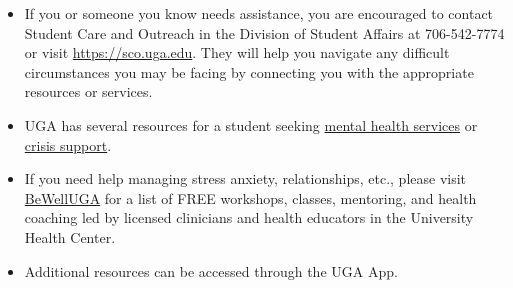 \documentclass[11pt, letterpaper]{article}
\begin{document}
\begin{itemize}
	\item If you or someone you know needs assistance, you are encouraged to contact Student Care and Outreach in the Division of Student Affairs at 706-542-7774 or visit \href{https://sco.uga.edu}{https://sco.uga.edu}. They will help you navigate any difficult circumstances you may be facing by connecting you with the appropriate resources or services. 
	\item UGA has several resources for a student seeking \href{https://www.uhs.uga.edu/bewelluga/bewelluga}{mental health services} or \href{https://www.uhs.uga.edu/info/emergencies}{crisis support}. 
	\item If you need help managing stress anxiety, relationships, etc., please visit \href{https://www.uhs.uga.edu/bewelluga/bewelluga}{BeWellUGA} for a list of FREE workshops, classes, mentoring, and health coaching led by licensed clinicians and health educators in the University Health Center.
	\item Additional resources can be accessed through the UGA App.
\end{itemize}


\end{document}
